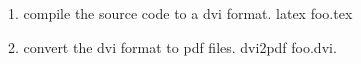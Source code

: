 \documentclass{article}
\begin{document}
1. compile the source code to a dvi format.\newline
    latex foo.tex

2. convert the dvi format to pdf files.\newline
    dvi2pdf foo.dvi.
\end{document}
